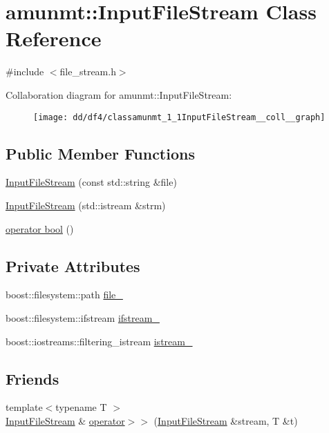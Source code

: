 \hypertarget{classamunmt_1_1InputFileStream}{}\section{amunmt\+:\+:Input\+File\+Stream Class Reference}
\label{classamunmt_1_1InputFileStream}


{\ttfamily \#include $<$file\+\_\+stream.\+h$>$}



Collaboration diagram for amunmt\+:\+:Input\+File\+Stream\+:
\nopagebreak
\begin{figure}[H]
\begin{center}
\leavevmode
\texttt{[image: dd/df4/classamunmt\_1\_1InputFileStream\_\_coll\_\_graph]}
\end{center}
\end{figure}
\subsection*{Public Member Functions}
\begin{DoxyCompactItemize}
\item 
\hyperlink{classamunmt_1_1InputFileStream_ae939bab8353146a0507e7b0f598d1b26}{Input\+File\+Stream} (const std\+::string \&file)
\item 
\hyperlink{classamunmt_1_1InputFileStream_a0f63ebe2bf8e68acea999d3b594e717e}{Input\+File\+Stream} (std\+::istream \&strm)
\item 
\hyperlink{classamunmt_1_1InputFileStream_a812fc326641a9f9df73888be0245d16a}{operator bool} ()
\end{DoxyCompactItemize}
\subsection*{Private Attributes}
\begin{DoxyCompactItemize}
\item 
boost\+::filesystem\+::path \hyperlink{classamunmt_1_1InputFileStream_a74cf2fbe2b1b32326235be7f5497157c}{file\+\_\+}
\item 
boost\+::filesystem\+::ifstream \hyperlink{classamunmt_1_1InputFileStream_a1ed4c98694688ee5e7ba39c7005ed56a}{ifstream\+\_\+}
\item 
boost\+::iostreams\+::filtering\+\_\+istream \hyperlink{classamunmt_1_1InputFileStream_a8701f7b64ec9d6f818cbf6db77645f18}{istream\+\_\+}
\end{DoxyCompactItemize}
\subsection*{Friends}
\begin{DoxyCompactItemize}
\item 
{\footnotesize template$<$typename T $>$ }\\\hyperlink{classamunmt_1_1InputFileStream}{Input\+File\+Stream} \& \hyperlink{classamunmt_1_1InputFileStream_a8389de80920d111927eb0954d6b284ef}{operator$>$$>$} (\hyperlink{classamunmt_1_1InputFileStream}{Input\+File\+Stream} \&stream, T \&t)
\end{DoxyCompactItemize}


